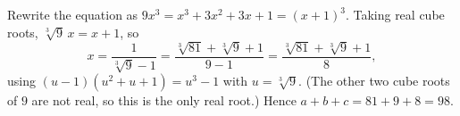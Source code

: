 Rewrite the equation as $9x^3=x^3+3x^2+3x+1=(x+1)^3$. Taking real cube roots, $\sqrt[3]{9}\,x=x+1$, so
\[
x=\dfrac{1}{\sqrt[3]{9}-1}=\dfrac{\sqrt[3]{81}+\sqrt[3]{9}+1}{9-1}=\dfrac{\sqrt[3]{81}+\sqrt[3]{9}+1}{8},
\]
using $(u-1)(u^2+u+1)=u^3-1$ with $u=\sqrt[3]9$. (The other two cube roots of $9$ are not real, so this is the only real root.) Hence $a+b+c=81+9+8=\boxed{98}$.
